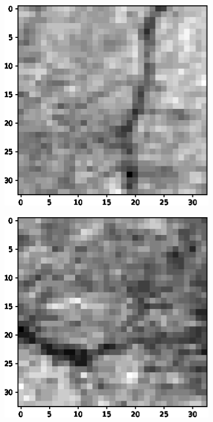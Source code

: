 \documentclass[aps,prb,10pt,twocolumn,groupedaddress]{revtex4-1}
\begin{document}
\begin{figure}[!t]
\begin{subfigure}[]{0.3\textwidth}
		\caption{}
	\end{subfigure}
	\hspace{0.5cm}
	\centering
    \begin{subfigure}[]{0.3\textwidth}
    	\centering
    	\includegraphics[width=\textwidth]{images/negative2.eps}
    	\caption{}
    \end{subfigure}
    \hspace{0.5cm}
    \centering
    \begin{subfigure}[]{0.3\textwidth}
    	\centering
    	\includegraphics[width=\textwidth]{images/negative3.eps}

\end{subfigure}
\end{figure}
\end{document}

